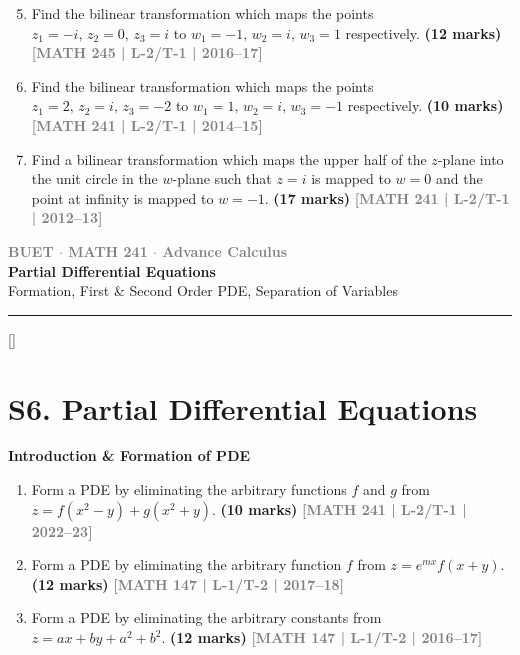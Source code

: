 \documentclass[12pt,a3paper]{article}
\newcommand{\yr}[1]{\hfill\textcolor{gray}{\small\textbf{[#1]}}}
\newcommand{\mk}[1]{\textcolor{orange!70!black}{\small\textbf{(#1 marks)}}}
\newcommand{\subtopic}[2]{%
  \vspace{10pt}
  \noindent\begin{tcolorbox}[colback=#1!8,colframe=#1,boxrule=0.6pt,arc=4pt,
    left=6pt,right=6pt,top=4pt,bottom=4pt]
    \small\bfseries\textcolor{#1}{#2}
  \end{tcolorbox}
  \vspace{2pt}
}
\newcommand{\secdivider}[3]{%
  \newpage\thispagestyle{empty}%
  \vspace*{\fill}%
  \begin{tcolorbox}[enhanced,colback=#3!6,colframe=#3,boxrule=1.5pt,arc=8pt,
    left=20pt,right=20pt,top=22pt,bottom=22pt,
    shadow={3pt}{-3pt}{0pt}{black!15}]
    \centering
    {\large\textcolor{gray}{\textbf{BUET $\cdot$ MATH 241 $\cdot$ Advance Calculus}}}\\[8pt]
    {\fontsize{26}{32}\selectfont\bfseries\textcolor{#3}{#1}}\\[6pt]
    {\fontsize{15}{19}\selectfont\textcolor{dgray}{#2}}\\[12pt]
    \textcolor{#3!60}{\rule{0.5\textwidth}{0.5pt}}
  \end{tcolorbox}%
  \vspace*{\fill}\newpage%
}
\begin{document}
\begin{enumerate}
\setcounter{enumi}{4}

\item Find the bilinear transformation which maps the points $z_{1}=-i,\,z_{2}=0,\,z_{3}=i$ to $w_{1}=-1,\,w_{2}=i,\,w_{3}=1$ respectively.
\mk{12} \yr{MATH 245 | L-2/T-1 | 2016--17}


\item Find the bilinear transformation which maps the points $z_{1}=2,\,z_{2}=i,\,z_{3}=-2$ to $w_{1}=1,\,w_{2}=i,\,w_{3}=-1$ respectively.
\mk{10} \yr{MATH 241 | L-2/T-1 | 2014--15}


\item Find a bilinear transformation which maps the upper half of the $z$-plane into the unit circle in the $w$-plane such that $z=i$ is mapped to $w=0$ and the point at infinity is mapped to $w=-1$.
\mk{17} \yr{MATH 241 | L-2/T-1 | 2012--13}


\end{enumerate}


\secdivider{Partial Differential Equations}{Formation, First \& Second Order PDE, Separation of Variables}{cF}
\titleformat{\section}{\large\bfseries\color{cF}}{}{0em}{}[\titlerule]

\section{S6. Partial Differential Equations}
\label{sec:S6}

\subtopic{cF}{Introduction \& Formation of PDE}
\label{sub:s6-formation}

\begin{enumerate}

\item Form a PDE by eliminating the arbitrary functions $f$ and $g$ from $z=f(x^{2}-y)+g(x^{2}+y)$.
\mk{10} \yr{MATH 241 | L-2/T-1 | 2022--23}


\item Form a PDE by eliminating the arbitrary function $f$ from $z=e^{mx}f(x+y)$.
\mk{12} \yr{MATH 147 | L-1/T-2 | 2017--18}


\item Form a PDE by eliminating the arbitrary constants from $z=ax+by+a^{2}+b^{2}$.
\mk{12} \yr{MATH 147 | L-1/T-2 | 2016--17}


\end{enumerate}
\end{document}
